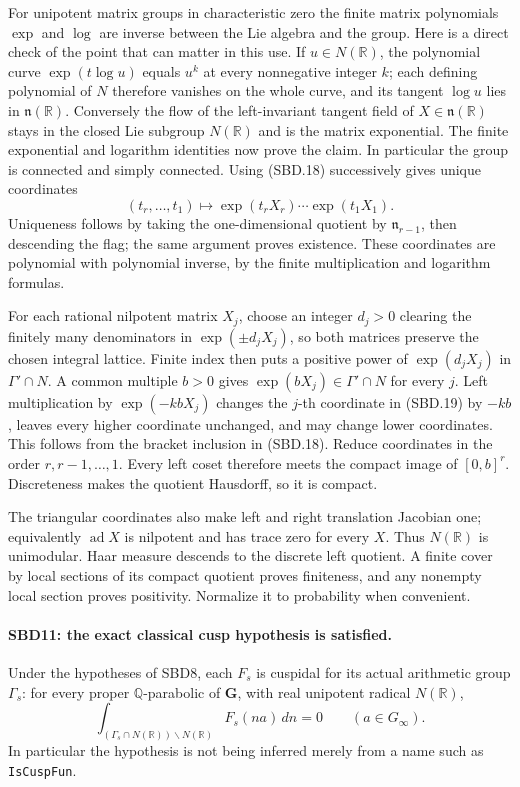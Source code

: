 For unipotent matrix groups in characteristic zero the finite
matrix polynomials \(\exp\) and \(\log\) are inverse between
the Lie algebra and the group.  Here is a direct check of the
point that can matter in this use.  If \(u\in N(\mathbb R)\),
the polynomial curve \(\exp(t\log u)\) equals \(u^k\) at
every nonnegative integer \(k\); each defining polynomial of
\(N\) therefore vanishes on the whole curve, and its tangent
\(\log u\) lies in \(\mathfrak n(\mathbb R)\).  Conversely
the flow of the left-invariant tangent field of
\(X\in\mathfrak n(\mathbb R)\) stays in the closed Lie
subgroup \(N(\mathbb R)\) and is the matrix exponential.
The finite exponential and logarithm identities now prove the
claim.  In particular the group is connected and simply
connected.  Using (SBD.18) successively gives unique coordinates
\[
 (t_r,\ldots,t_1)\longmapsto
        \exp(t_rX_r)\cdots\exp(t_1X_1).
 \tag{SBD.19}
\]
Uniqueness follows by taking the one-dimensional quotient by
\(\mathfrak n_{r-1}\), then descending the flag; the same
argument proves existence.  These coordinates are polynomial
with polynomial inverse, by the finite multiplication and
logarithm formulas.

For each rational nilpotent matrix \(X_j\), choose an integer
\(d_j>0\) clearing the finitely many denominators in
\(\exp(\pm d_jX_j)\), so both matrices preserve the chosen
integral lattice.  Finite index then puts a positive power of
\(\exp(d_jX_j)\) in \(\Gamma'\cap N\).  A common multiple
\(b>0\) gives \(\exp(bX_j)\in\Gamma'\cap N\) for every
\(j\).  Left multiplication by \(\exp(-kbX_j)\) changes the
\(j\)-th coordinate in (SBD.19) by \(-kb\), leaves every
higher coordinate unchanged, and may change lower coordinates.
This follows from the bracket inclusion in (SBD.18).
Reduce coordinates in the order \(r,r-1,\ldots,1\).
Every left coset therefore meets the compact image of
\([0,b]^r\).  Discreteness makes the quotient Hausdorff, so
it is compact.

The triangular coordinates also make left and right translation
Jacobian one; equivalently \(\operatorname{ad}X\) is nilpotent
and has trace zero for every \(X\).  Thus \(N(\mathbb R)\)
is unimodular.  Haar measure descends to the discrete left
quotient.  A finite cover by local sections of its compact
quotient proves finiteness, and any nonempty local section
proves positivity.  Normalize it to probability when convenient.

\paragraph{SBD11: the exact classical cusp hypothesis is satisfied.}
\label{claim:SBD11}
Under the hypotheses of SBD8, each \(F_s\) is cuspidal for its
actual arithmetic group \(\Gamma_s\): for every proper
\(\mathbb Q\)-parabolic of \(\mathbf G\), with real unipotent
radical \(N(\mathbb R)\),
\[
 \int_{(\Gamma_s\cap N(\mathbb R))\backslash N(\mathbb R)}
          F_s(na)\,dn=0\qquad(a\in G_\infty).
 \tag{SBD.20}
\]
In particular the hypothesis is not being inferred merely
from a name such as \texttt{Is\allowbreak Cusp\allowbreak Fun}.

